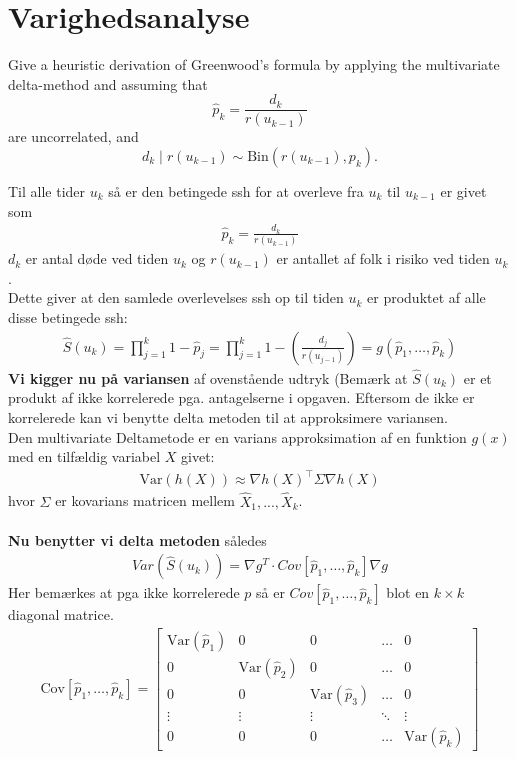 \chapter{Varighedsanalyse}
\begin{note}
Give a heuristic derivation of Greenwood's formula by applying the multivariate delta-method and assuming that 
\[
\hat{p}_k = \frac{d_k}{r(u_{k-1})}
\]
are uncorrelated, and 
\[
d_k \mid r(u_{k-1}) \sim \text{Bin}(r(u_{k-1}), p_k).
\]
\end{note}
Til alle tider $u_k$ så er den betingede ssh for at overleve fra $u_k$ til $u_{k-1}$ er givet som
\begin{align*}
    \hat{p}_k=\frac{d_k}{r(u_{k-1})}
\end{align*}
$d_k$ er antal døde ved tiden $u_k$ og $r(u_{k-1})$ er antallet af folk i risiko ved tiden $u_k$.\\
Dette giver at den samlede overlevelses ssh op til tiden $u_k$ er produktet af alle disse betingede ssh:
\begin{align}\label{s_funktion}
    \hat{S}(u_k)=\prod_{j=1}^k 1-\hat{p}_j=\prod_{j=1}^k1-\left(\frac{d_j}{r(u_{j-1})}\right)=g(\hat{p}_1,\ldots,\hat{p}_k)
\end{align}
\textbf{Vi kigger nu på variansen} af ovenstående udtryk (Bemærk at $\hat{S}(u_k)$ er et produkt af ikke korrelerede  pga. antagelserne i opgaven. Eftersom de ikke er korrelerede kan vi benytte delta metoden til at approksimere variansen.\\
Den multivariate Deltametode er en varians approksimation af en funktion $g(x)$ med en tilfældig variabel $X$ givet:
\begin{align*}
    \text{Var}(h(X)) \approx \nabla h(X)^\top \Sigma \nabla h(X)
\end{align*}
hvor $\Sigma$ er kovarians matricen mellem $\hat{X}_1,...,\hat{X}_k$.\\\\

\textbf{Nu benytter vi delta metoden} således
\begin{align*}
    Var(\hat{S}(u_k))=\nabla g^T\cdot Cov[\hat{p}_1,\ldots,\hat{p}_k]\nabla g
\end{align*}
Her bemærkes at pga ikke korrelerede $p$ så er $Cov[\hat{p}_1,\ldots,\hat{p}_k]$ blot en $k\times k$ diagonal matrice.
\begin{align}
\text{Cov}[\hat{p}_1, \dots, \hat{p}_k] = 
\begin{bmatrix}
\text{Var}(\hat{p}_1) & 0 & 0 & \dots  & 0 \\
0 & \text{Var}(\hat{p}_2) & 0 & \dots  & 0 \\
0 & 0 & \text{Var}(\hat{p}_3) & \dots  & 0 \\
\vdots & \vdots & \vdots & \ddots & \vdots \\
0 & 0 & 0 & \dots  & \text{Var}(\hat{p}_k)
\end{bmatrix}
\end{align}

